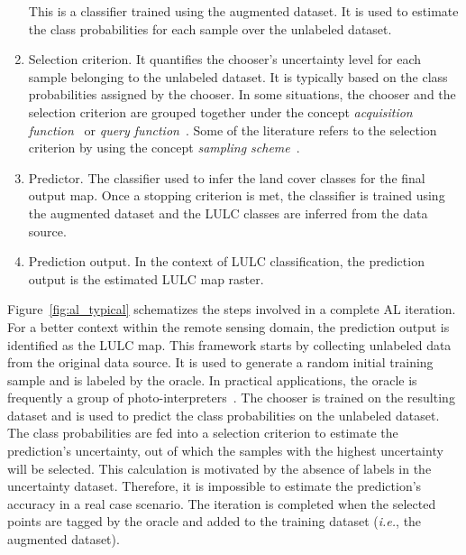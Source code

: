 \documentclass[parskip=full]{scrartcl}
\begin{document}
\begin{enumerate}
        This is a classifier trained using the augmented dataset. It is used to
        estimate the class probabilities for each sample over the unlabeled
        dataset.
    \item Selection criterion. It quantifies the chooser's uncertainty level
        for each sample belonging to the unlabeled dataset. It is typically
        based on the class probabilities assigned by the chooser. In some
        situations, the chooser and the selection criterion are grouped
        together under the concept \textit{acquisition
        function}~\cite{Ruzicka2020} or \textit{query function}~\cite{Su2020}.
        Some of the literature refers to the selection criterion by using the
        concept \textit{sampling scheme}~\cite{Liu2020}.
    \item Predictor. The classifier used to infer the land cover classes for
        the final output map. Once a stopping criterion is met, the classifier
        is trained using the augmented dataset and the LULC classes are
        inferred from the data source.
    \item Prediction output. In the context of LULC classification, the
        prediction output is the estimated LULC map raster.
\end{enumerate}

Figure~\ref{fig:al_typical} schematizes the steps involved in a complete AL
iteration. For a better context within the remote sensing domain, the
prediction output is identified as the LULC map. This framework starts by
collecting unlabeled data from the original data source. It is used to generate
a random initial training sample and is labeled by the oracle. In practical
applications, the oracle is frequently a group of
photo-interpreters~\cite{Kottke2017}. The chooser is trained on the resulting
dataset and is used to predict the class probabilities on the unlabeled
dataset. The class probabilities are fed into a selection criterion to estimate
the prediction's uncertainty, out of which the samples with the highest
uncertainty will be selected. This calculation is motivated by the absence of
labels in the uncertainty dataset. Therefore, it is impossible to estimate the
prediction's accuracy in a real case scenario. The iteration is completed when
the selected points are tagged by the oracle and added to the training dataset
(\textit{i.e.}, the augmented dataset). 
\end{document}

